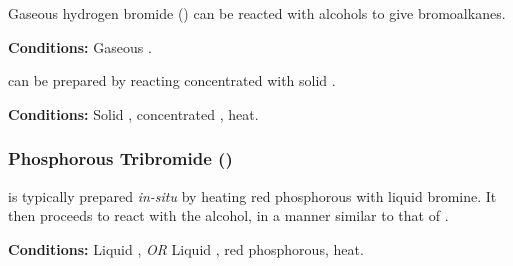 				Gaseous hydrogen bromide () can be reacted with alcohols to give bromoalkanes.

				\vspace{1.5em}
				\vbox{\textbf{Conditions:}	\tabto{35mm}Gaseous .}


				 can be prepared by reacting concentrated  with solid .

				\vspace{1.5em}
				\vbox{\textbf{Conditions:}	\tabto{35mm}Solid , concentrated , heat.}



			\subsubsection{Phosphorous Tribromide ()}

				 is typically prepared \textit{in-situ} by heating red phosphorous with liquid bromine. It then proceeds to
				react with the alcohol, in a manner similar to that of .

				\vspace{1.5em}
				\vbox{\textbf{Conditions:}	\tabto{35mm}Liquid , \textit{OR}
											\tabto{35mm}Liquid , {\color{Red}red} phosphorous, heat.}



